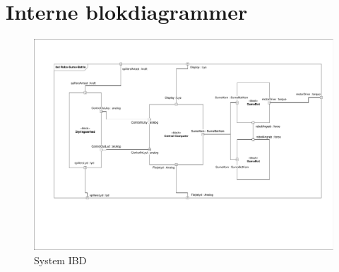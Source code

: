 \section{Interne blokdiagrammer}
\begin{figure}[hpt]
	\centering
   	\includegraphics[page=1,width=1\linewidth]{figs/Diagrammer/IBD.pdf}
	\caption{System IBD}
	\label{fig:IBD_System_old}
\end{figure}

